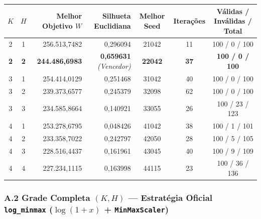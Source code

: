 \documentclass[a4paper,11pt]{article}
\begin{document}
\begin{center}
\begin{minipage}{\linewidth}
\centering
{}
\small
\setlength{\tabcolsep}{5pt}
\renewcommand{\arraystretch}{1.18}
\begin{tabular}{c c r r c c c}
\toprule
\textbf{$K$} & \textbf{$H$} & \textbf{Melhor Objetivo $W$} & \textbf{Silhueta Euclidiana} & \textbf{Melhor Seed} & \textbf{Iterações} & \textbf{Válidas / Inválidas / Total} \\
\midrule
2 & 1 & 256.513,7482 & 0,296094 & 21042 & 11 & 100 / 0 / 100 \\
\textbf{2} & \textbf{2} & \textbf{244.486,6983} & \textbf{0,659631} \textit{(Vencedor)} & \textbf{22042} & \textbf{37} & \textbf{100 / 0 / 100} \\
3 & 1 & 254.414,0129 & 0,251468 & 31042 & 40 & 100 / 0 / 100 \\
3 & 2 & 239.373,6577 & 0,245379 & 32098 & 62 & 100 / 0 / 100 \\
3 & 3 & 234.585,8664 & 0,140921 & 33055 & 26 & 100 / 23 / 123 \\
4 & 1 & 253.278,6795 & 0,048426 & 41042 & 38 & 100 / 1 / 101 \\
4 & 2 & 233.358,7022 & 0,242797 & 42050 & 28 & 100 / 5 / 105 \\
4 & 3 & 228.516,4437 & 0,161961 & 43045 & 40 & 100 / 9 / 109 \\
4 & 4 & 227.234,1115 & 0,163998 & 44115 & 23 & 100 / 36 / 136 \\
\bottomrule
\end{tabular}
\end{minipage}
\end{center}


\subsubsection*{\texorpdfstring{A.2 Grade Completa $(K, H)$ --- Estratégia Oficial \texttt{log\_minmax} ($\log(1+x)$ + \texttt{MinMaxScaler})}{A.2 Grade Completa (K, H) - Estratégia Oficial logminmax (log(1+x) + MinMaxScaler)}}\label{sec:a-2-grade-completa-k-h-estrategia-oficial-logminmax-log-1-x-minmaxscaler}
\end{document}

